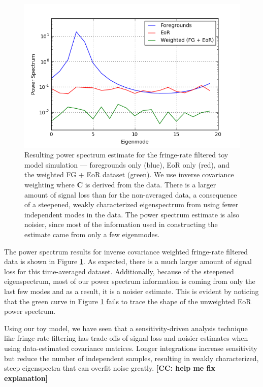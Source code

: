 \documentclass[preprint2,numberedappendix,tighten]{aastex6}  %
\newcommand{\cc}[1]{{\color{purple} \textbf{[CC: #1]}}}
\begin{document}
\begin{figure}
	\centering
	\includegraphics[trim={0.3cm 0.2cm 0.3cm 0.3cm},clip,width=\columnwidth]{plots/toy_sigloss7.png}
	\caption{Resulting power spectrum estimate for the fringe-rate filtered toy model simulation --- foregrounds only (blue), EoR only (red), and the weighted FG + EoR dataset (green). We use inverse covariance weighting where $\textbf{C}$ is derived from the data. There is a larger amount of signal loss than for the non-averaged data, a consequence of a steepened, weakly characterized eigenspectrum from using fewer independent modes in the data. The power spectrum estimate is also noisier, since most of the information used in constructing the estimate came from only a few eigenmodes.}
	\label{fig:toy_sigloss7}
\end{figure}

The power spectrum results for inverse covariance weighted fringe-rate filtered data is shown in Figure \ref{fig:toy_sigloss7}. As expected, there is a much larger amount of signal loss for this time-averaged dataset. Additionally, because of the steepened eigenspectrum, most of our power spectrum information is coming from only the last few modes and as a result, it is a noisier estimate. This is evident by noticing that the green curve in Figure \ref{fig:toy_sigloss7} fails to trace the shape of the unweighted EoR power spectrum.

Using our toy model, we have seen that a sensitivity-driven analysis technique like fringe-rate filtering has trade-offs of signal loss and noisier estimates when using data-estimated covariance matrices. Longer integrations increase sensitivity but reduce the number of independent samples, resulting in weakly characterized, steep eigenspectra that can overfit noise greatly. \cc{help me fix explanation}
\end{document}
